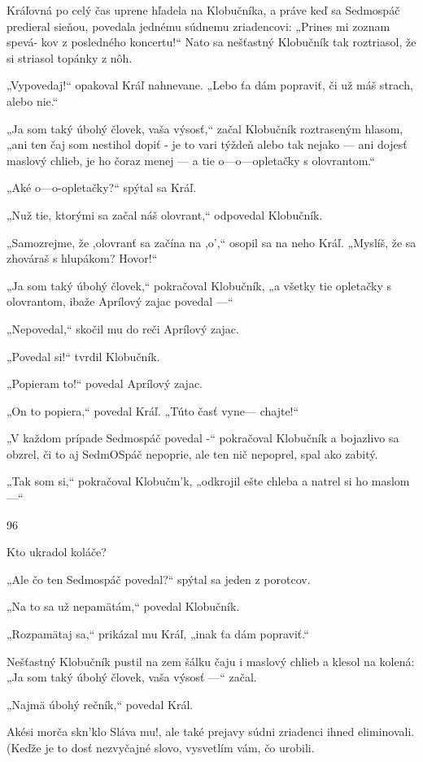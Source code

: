 \documentclass[12pt]{book}
\begin{document}
\begin{Parallel}[p]{}{}
{Kráľovná po celý čas uprene hľadela na Klobučníka,
a práve keď sa Sedmospáč predieral sieňou, povedala
jednému súdnemu zriadencovi: „Prines mi zoznam spevá-
kov z posledného koncertu!“ Nato sa nešťastný Klobučník
tak roztriasol, že si striasol topánky z nôh.

„Vypovedaj!“ opakoval Kráľ nahnevane. „Lebo ťa dám
popraviť, či už máš strach, alebo nie.“

„Ja som taký úbohý človek, vaša výsosť,“ začal Klobučník
roztraseným hlasom, „ani ten čaj som nestihol dopiť - je to
vari týždeň alebo tak nejako — ani dojesť maslový chlieb, je
ho čoraz menej — a tie o—o—opletačky s olovrantom.“

„Aké o—o-opletačky?“ spýtal sa Kráľ.

„Nuž tie, ktorými sa začal náš olovrant,“ odpovedal
Klobučník.

„Samozrejme, že ,olovranť sa začína na ,o',“ osopil sa na
neho Kráľ. „Myslíš, že sa zhováraš s hlupákom? Hovor!“

„Ja som taký úbohý človek,“ pokračoval Klobučník, „a
všetky tie opletačky s olovrantom, ibaže Aprílový zajac
povedal —“

„Nepovedal,“ skočil mu do reči Aprílový zajac.

„Povedal si!“ tvrdil Klobučník.

„Popieram to!“ povedal Aprílový zajac.

„On to popiera,“ povedal Kráľ. „Túto časť vyne—
chajte!“

„V každom prípade Sedmospáč povedal -“ pokračoval
Klobučník a bojazlivo sa obzrel, či to aj SedmOSpáč
nepoprie, ale ten nič nepoprel, spal ako zabitý.

„Tak som si,“ pokračoval Klobučm'k, „odkrojil ešte
chleba a natrel si ho maslom —“

96

Kto ukradol koláče?

„Ale čo ten Sedmospáč povedal?“ spýtal sa jeden
z porotcov.

„Na to sa už nepamätám,“ povedal Klobučník.

„Rozpamätaj sa,“ prikázal mu Kráľ, „inak ťa dám
popraviť.“

Nešťastný Klobučník pustil na zem šálku čaju i maslový
chlieb a klesol na kolená: „Ja som taký úbohý človek, vaša
výsosť —“ začal.

„Najmä úbohý rečník,“ povedal Král.

Akési morča skn'klo Sláva mu!, ale také prejavy súdni
zriadenci ihned eliminovali. (Keďže je to dosť nezvyčajné
slovo, vysvetlím vám, čo urobili.

}
\end{Parallel}
\end{document}
